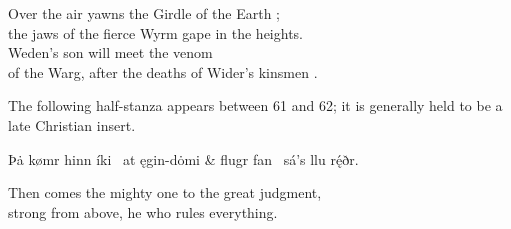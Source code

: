 \bvb Over the air yawns the Girdle of the Earth ; \\
the jaws of the fierce Wyrm gape in the heights. \\
Weden’s son  will meet the venom \\
of the Warg, after the deaths of Wider’s kinsmen .\evb\evg

\sectionline

{\small The following half-stanza appears between 61 and 62; it is generally held to be a late Christian insert.}

\bvg\bva[H4]%
Þȧ kømr hinn íki \hld\ at ęgin-dȯmi &
flugr fan \hld\ sá’s llu rę́ðr.\eva

\bvb Then comes the mighty one to the great judgment, \\
strong from above, he who rules everything.\evb\evg

\sectionline
